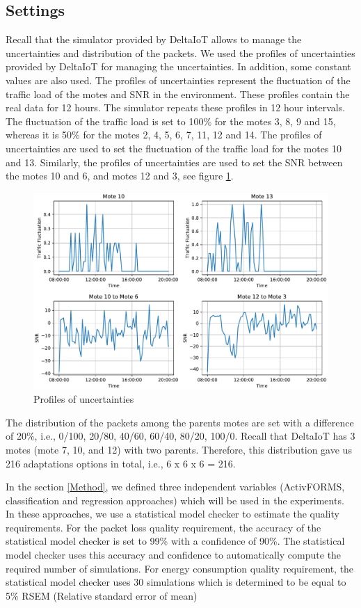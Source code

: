 \documentclass[a4paper,12pt]{article}
\begin{document}
\subsection{Settings} \label{Settings}
Recall that the simulator provided by DeltaIoT allows to manage the uncertainties and distribution of the packets. We used the profiles of uncertainties provided by DeltaIoT for managing the uncertainties. In addition, some constant values are also used. The profiles of uncertainties represent the fluctuation of the traffic load of the motes and SNR in the environment. These profiles contain the real data for 12 hours. The simulator repeats these profiles in 12 hour intervals. The fluctuation of the traffic load is set to 100\% for the motes 3, 8, 9 and 15, whereas it is 50\% for the motes 2, 4, 5, 6, 7, 11, 12 and 14. The profiles of uncertainties are used to set the fluctuation of the traffic load for the motes 10 and 13. Similarly, the profiles of uncertainties are used to set the SNR between the motes 10 and 6, and motes 12 and 3, see figure \ref{Profiles}.
\begin{figure}[H]
	\centering
	\includegraphics[keepaspectratio, width=\linewidth]{graphs/Profiles.pdf}
	\caption{Profiles of uncertainties}
	\label{Profiles}
\end{figure}
The distribution of the packets among the parents motes are set with a difference of 20\%, i.e., 0/100, 20/80, 40/60, 60/40, 80/20, 100/0. Recall that  DeltaIoT has 3 motes (mote 7, 10, and 12) with two parents. Therefore, this distribution gave us 216 adaptations options in total, i.e., 6 x 6 x 6 = 216.

In the section \ref{Method}, we defined three independent variables (ActivFORMS, classification and regression approaches) which will be used in the experiments. In these approaches, we use a statistical model checker to estimate the quality requirements. For the packet loss quality requirement, the accuracy of the statistical model checker is set to 99\% with a confidence of 90\%. The statistical model checker uses this accuracy and confidence to automatically compute the required number of simulations. For energy consumption quality requirement, the statistical model checker uses 30 simulations which is determined to be equal to 5\% RSEM (Relative standard error of mean) %
\end{document}
